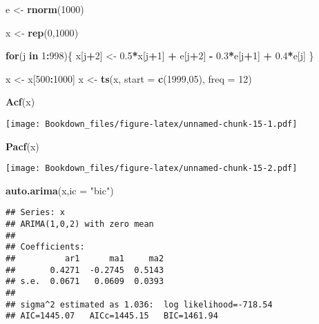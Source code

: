 \documentclass[
]{book}
\newenvironment{Shaded}{\begin{snugshade}}{\end{snugshade}}
\newcommand{\ControlFlowTok}[1]{\textcolor[rgb]{0.13,0.29,0.53}{\textbf{#1}}}
\newcommand{\DataTypeTok}[1]{\textcolor[rgb]{0.13,0.29,0.53}{#1}}
\newcommand{\DecValTok}[1]{\textcolor[rgb]{0.00,0.00,0.81}{#1}}
\newcommand{\FloatTok}[1]{\textcolor[rgb]{0.00,0.00,0.81}{#1}}
\newcommand{\KeywordTok}[1]{\textcolor[rgb]{0.13,0.29,0.53}{\textbf{#1}}}
\newcommand{\NormalTok}[1]{#1}
\newcommand{\OperatorTok}[1]{\textcolor[rgb]{0.81,0.36,0.00}{\textbf{#1}}}
\newcommand{\StringTok}[1]{\textcolor[rgb]{0.31,0.60,0.02}{#1}}
\begin{document}
\begin{Shaded}
\begin{Highlighting}[]
\NormalTok{e \textless{}{-}}\StringTok{ }\KeywordTok{rnorm}\NormalTok{(}\DecValTok{1000}\NormalTok{)}

\NormalTok{x \textless{}{-}}\StringTok{ }\KeywordTok{rep}\NormalTok{(}\DecValTok{0}\NormalTok{,}\DecValTok{1000}\NormalTok{)}

\ControlFlowTok{for}\NormalTok{(j }\ControlFlowTok{in} \DecValTok{1}\OperatorTok{:}\DecValTok{998}\NormalTok{)\{}
\NormalTok{  x[j}\OperatorTok{+}\DecValTok{2}\NormalTok{] \textless{}{-}}\StringTok{ }\FloatTok{0.5}\OperatorTok{*}\NormalTok{x[j}\OperatorTok{+}\DecValTok{1}\NormalTok{] }\OperatorTok{+}\StringTok{ }\NormalTok{e[j}\OperatorTok{+}\DecValTok{2}\NormalTok{] }\OperatorTok{{-}}\StringTok{ }\FloatTok{0.3}\OperatorTok{*}\NormalTok{e[j}\OperatorTok{+}\DecValTok{1}\NormalTok{] }\OperatorTok{+}\StringTok{ }\FloatTok{0.4}\OperatorTok{*}\NormalTok{e[j]}
\NormalTok{\}}

\NormalTok{x \textless{}{-}}\StringTok{ }\NormalTok{x[}\DecValTok{500}\OperatorTok{:}\DecValTok{1000}\NormalTok{]}
\NormalTok{x \textless{}{-}}\StringTok{ }\KeywordTok{ts}\NormalTok{(x, }\DataTypeTok{start =} \KeywordTok{c}\NormalTok{(}\DecValTok{1999}\NormalTok{,}\DecValTok{05}\NormalTok{), }\DataTypeTok{freq =} \DecValTok{12}\NormalTok{)}

\KeywordTok{Acf}\NormalTok{(x)}
\end{Highlighting}
\end{Shaded}

\texttt{[image: Bookdown\_files/figure-latex/unnamed-chunk-15-1.pdf]}

\begin{Shaded}
\begin{Highlighting}[]
\KeywordTok{Pacf}\NormalTok{(x)}
\end{Highlighting}
\end{Shaded}

\texttt{[image: Bookdown\_files/figure-latex/unnamed-chunk-15-2.pdf]}

\begin{Shaded}
\begin{Highlighting}[]
\KeywordTok{auto.arima}\NormalTok{(x,}\DataTypeTok{ic =} \StringTok{"bic"}\NormalTok{)}
\end{Highlighting}
\end{Shaded}

\begin{verbatim}
## Series: x 
## ARIMA(1,0,2) with zero mean 
## 
## Coefficients:
##          ar1      ma1     ma2
##       0.4271  -0.2745  0.5143
## s.e.  0.0671   0.0609  0.0393
## 
## sigma^2 estimated as 1.036:  log likelihood=-718.54
## AIC=1445.07   AICc=1445.15   BIC=1461.94
\end{verbatim}
\end{document}
